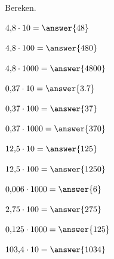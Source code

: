 \documentclass{ximera}
\begin{document}
\begin{oefening}{\oefB\ESS}

Bereken.

\begin{question} \(4{,}8\cdot10=\answer{48}\) \end{question}

\begin{question} \(4{,}8\cdot100=\answer{480}\) \end{question}

\begin{question} \(4{,}8\cdot1000=\answer{4800}\) \end{question}

\begin{question} \(0{,}37\cdot10=\answer{3.7}\) \end{question}

\begin{question} \(0{,}37\cdot100=\answer{37}\) \end{question}

\begin{question} \(0{,}37\cdot1000=\answer{370}\) \end{question}

\begin{question} \(12{,}5\cdot10=\answer{125}\) \end{question}

\begin{question} \(12{,}5\cdot100=\answer{1250}\) \end{question}

\begin{question} \(0{,}006\cdot1000=\answer{6}\) \end{question}

\begin{question} \(2{,}75\cdot100=\answer{275}\) \end{question}

\begin{question} \(0{,}125\cdot1000=\answer{125}\) \end{question}

\begin{question} \(103{,}4\cdot10=\answer{1034}\) \end{question}

\end{oefening}


\end{document}
